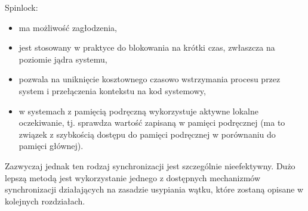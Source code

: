 Spinlock:
\begin{itemize}
    \item ma możliwość zagłodzenia,
    \item jest stosowany w praktyce do blokowania na krótki czas, zwłaszcza na poziomie jądra systemu,
    \item pozwala na uniknięcie kosztownego czasowo wstrzymania procesu przez system i przełączenia kontekstu na kod systemowy,
    \item w systemach z pamięcią podręczną wykorzystuje aktywne lokalne oczekiwanie, tj. sprawdza wartość zapisaną w pamięci podręcznej (ma to związek z szybkością dostępu do pamięci podręcznej w porównaniu do pamięci głównej).
\end{itemize}

Zazwyczaj jednak ten rodzaj synchronizacji jest szczególnie nieefektywny. Dużo lepszą metodą jest wykorzystanie jednego z dostępnych mechanizmów synchronizacji działających na zasadzie usypiania wątku, które zostaną opisane w kolejnych rozdziałach.

